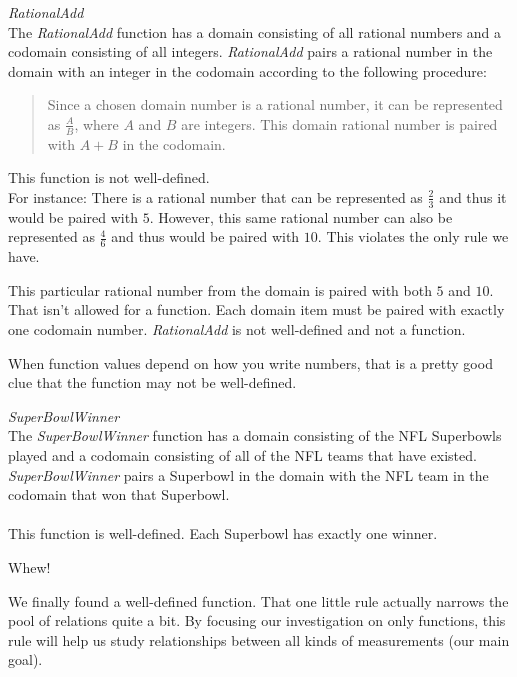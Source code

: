\documentclass{ximera}
\begin{document}
\begin{example} \textit{RationalAdd} \\
The \textit{RationalAdd} function has a domain consisting of all rational numbers and a codomain consisting of all integers.  \textit{RationalAdd} pairs a rational number in the domain with an integer in the codomain according to the following procedure: \\ 
\begin{quote}
Since a chosen domain number is a rational number, it can be represented as $\tfrac{A}{B}$, where $A$ and $B$ are integers. This domain rational number is paired with $A+B$ in the codomain.
\end{quote}
 
This function is not well-defined.  \\

For instance: There is a rational number that can be represented as $\tfrac{2}{3}$ and thus it would be paired with $5$.  However, this same rational number can also be represented as $\tfrac{4}{6}$ and thus would be paired with $10$.  This violates the only rule we have.  


This particular rational number from the domain is paired with both $5$ and $10$. That isn't allowed for a function. Each domain item must be paired with exactly one codomain number. \textit{RationalAdd} is not well-defined and not a function.

\begin{warning}
When function values depend on how you write numbers, that is a pretty good clue that the function may not be well-defined.
\end{warning}
\end{example}



\begin{example} \textit{SuperBowlWinner}  \\
The \textit{SuperBowlWinner} function has a domain consisting of the NFL Superbowls played and a codomain consisting of all of the NFL teams that have existed.  \textit{SuperBowlWinner} pairs a Superbowl in the domain with the NFL team in the codomain that won that Superbowl.  \\ 
\\
This function is well-defined. Each Superbowl has exactly one winner.
\end{example}



Whew!  

We finally found a well-defined function. That one little rule actually narrows the pool of relations quite a bit.  By focusing our investigation on only functions, this rule will help us study relationships between all kinds of measurements (our main goal). \\
\end{document}
